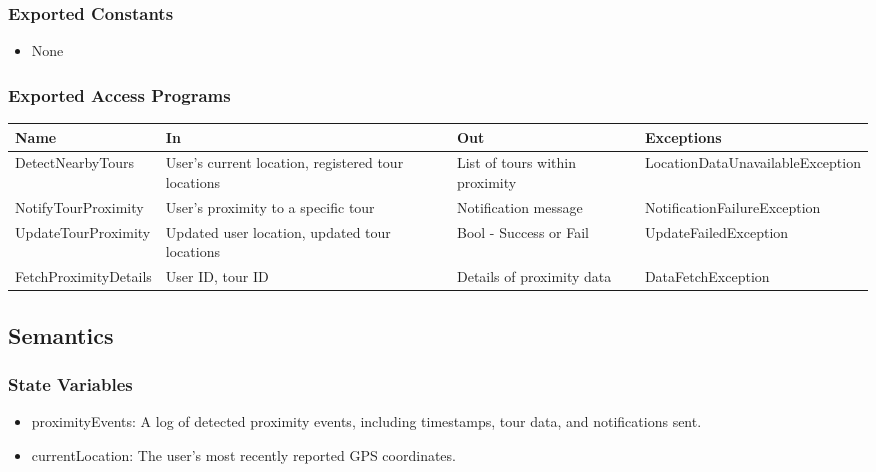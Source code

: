 \documentclass[12pt, titlepage]{article}
\begin{document}
\subsubsection{Exported Constants}

\begin{itemize}
  \item None
\end{itemize}

\subsubsection{Exported Access Programs}

\begin{center}
  \begin{tabular}{p{4cm} p{3cm} p{3cm} p{5cm}}
    \hline
    \textbf{Name}         & \textbf{In}                                        & \textbf{Out}                   & \textbf{Exceptions}              \\
    \hline
    DetectNearbyTours     & User’s current location, registered tour locations & List of tours within proximity & LocationDataUnavailableException \\
    \hline
    NotifyTourProximity   & User’s proximity to a specific tour                & Notification message           & NotificationFailureException     \\
    \hline
    UpdateTourProximity   & Updated user location, updated tour locations      & Bool - Success or Fail         & UpdateFailedException            \\
    \hline
    FetchProximityDetails & User ID, tour ID                                   & Details of proximity data      & DataFetchException               \\
    \hline
  \end{tabular}
\end{center}


\subsection{Semantics}

\subsubsection{State Variables}

\begin{itemize}
  \item proximityEvents: A log of detected proximity events, including timestamps, tour data, and notifications sent.
  \item currentLocation: The user's most recently reported GPS coordinates.
\end{itemize}
\end{document}
